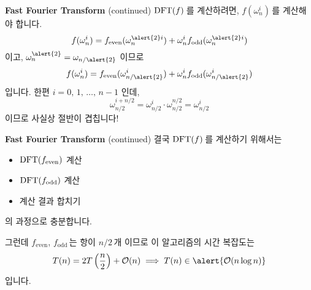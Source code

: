 \begin{frame}
    \begin{block}{\textbf{Fast Fourier Transform} (continued)}
        \(\mathrm{DFT}(f)\)\,를 계산하려면, \(f(\omega_{n}^i)\)\,를 계산해야 합니다.
        \[
            f(\omega_{n}^i) = f_{\mathrm{even}}(\omega_{n}^{\alert{2}i}) + \omega_n^i f_{\mathrm{odd}}(\omega_{n}^{\alert{2}i})
        \]
        이고, \pause \(\omega_n^{\alert{2}} = \omega_{n/\alert{2}}\) 이므로
        \[
            f(\omega_{n}^i) = f_{\mathrm{even}}(\omega_{n/\alert{2}}^{i}) + \omega_n^i f_{\mathrm{odd}}(\omega_{n/\alert{2}}^{i})
        \]
        입니다. \pause 한편 \(i = 0,\, 1,\, \dots,\, n - 1\) 인데,
        \[\omega_{n/2}^{i + n/2} = \omega_{n/2}^i \cdot \omega_{n/2}^{n/2} = \omega_{n/2}^i\]
        이므로 사실상 \alert{절반이 겹칩니다!}
    \end{block}
\end{frame}

\begin{frame}
    \begin{block}{\textbf{Fast Fourier Transform} (continued)}
        결국 \(\mathrm{DFT}(f)\)\,를 계산하기 위해서는 \pause
        \begin{itemize}
            \item \(\mathrm{DFT}(f_{\mathrm{even}})\) 계산 \pause
            \item \(\mathrm{DFT}(f_{\mathrm{odd}})\) 계산 \pause
            \item 계산 결과 합치기
        \end{itemize}
        의 과정으로 충분합니다.

        \pause

        \vspace*{10px}

        그런데 \(f_{\mathrm{even}}\), \(f_{\mathrm{odd}}\)\,는 항이 \alert{\(n/2\)}\,개 이므로 이 알고리즘의 시간 복잡도는
        \[
            T(n) = 2T\left(\frac{n}{2}\right) + \O(n) \implies T(n) \in \alert{\O(n\log n)}
        \]
        입니다.
    \end{block}
\end{frame}

